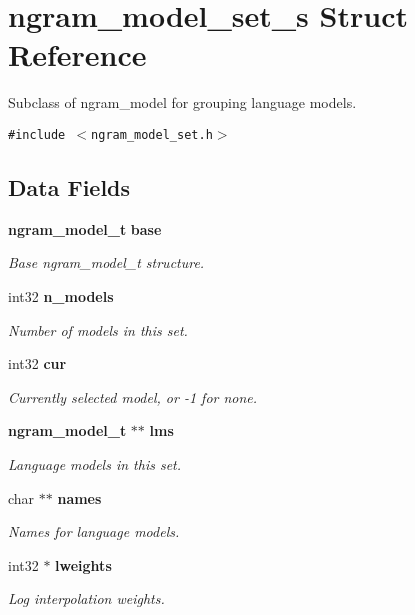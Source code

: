 \section{ngram\_\-model\_\-set\_\-s Struct Reference}
\label{structngram__model__set__s}
Subclass of ngram\_\-model for grouping language models.  


{\tt \#include $<$ngram\_\-model\_\-set.h$>$}

\subsection*{Data Fields}
\begin{CompactItemize}
\item 
{\bf ngram\_\-model\_\-t} {\bf base}
\begin{CompactList}\small\item\em Base ngram\_\-model\_\-t structure. \item\end{CompactList}\item 
int32 {\bf n\_\-models}
\begin{CompactList}\small\item\em Number of models in this set. \item\end{CompactList}\item 
int32 {\bf cur}
\begin{CompactList}\small\item\em Currently selected model, or -1 for none. \item\end{CompactList}\item 
{\bf ngram\_\-model\_\-t} $\ast$$\ast$ {\bf lms}
\begin{CompactList}\small\item\em Language models in this set. \item\end{CompactList}\item 
char $\ast$$\ast$ {\bf names}
\begin{CompactList}\small\item\em Names for language models. \item\end{CompactList}\item 
int32 $\ast$ {\bf lweights}
\begin{CompactList}\small\item\em Log interpolation weights. \item\end{CompactList}\item 

\end{CompactItemize}

